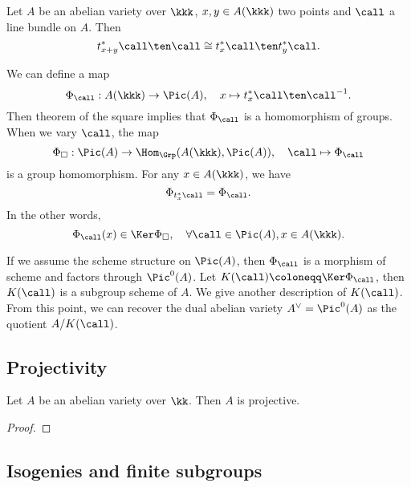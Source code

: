     \begin{theorem}\label{thm: theorem of the square}
        Let \(A\) be an abelian variety over \(\kkk\), \(x,y \in A(\kkk)\) two points and \(\call\) a line bundle on \(A\).
        Then 
        \[ t_{x+y}^*\call \ten \call \cong t_x^*\call \ten t_y^*\call. \]
    \end{theorem}

    \begin{remark}\label{rmk: theorem of the square and homomorphism to Picard group}
        We can define a map
        \[ \Phi_\call: A(\kkk) \to \Pic(A), \quad x \mapsto t_x^*\call \ten \call^{-1}. \]
        Then theorem of the square implies that \(\Phi_\call\) is a homomorphism of groups.
        When we vary \(\call\), the map 
        \[ \Phi_{\square}: \Pic(A) \to \Hom_{\Grp}(A(\kkk), \Pic(A)), \quad \call \mapsto \Phi_\call \]
        is a group homomorphism.
        For any \(x \in A(\kkk)\), we have
        \[ \Phi_{t_x^*\call} = \Phi_\call. \]
        In the other words, 
        \[ \Phi_\call(x) \in \Ker \Phi_{\square}, \quad \forall \call \in \Pic(A), x \in A(\kkk). \]
    \end{remark}

    If we assume the scheme structure on \(\Pic(A)\), then \(\Phi_\call\) is a morphism of scheme and factors through \(\Pic^0(A)\).
    Let \(K(\call) \coloneqq \Ker \Phi_\call\), then \(K(\call)\) is a subgroup scheme of \(A\).
    We give another description of \(K(\call)\).
    From this point, we can recover the dual abelian variety \(A^\vee = \Pic^0(A)\) as the quotient \(A/K(\call)\).


    


\subsection{Projectivity}

    \begin{theorem}\label{thm: abelian varieties are projective}
        Let $A$ be an abelian variety over $\kk$. 
        Then $A$ is projective.
    \end{theorem}
    \begin{proof}
    \end{proof}


\subsection{Isogenies and finite subgroups}

